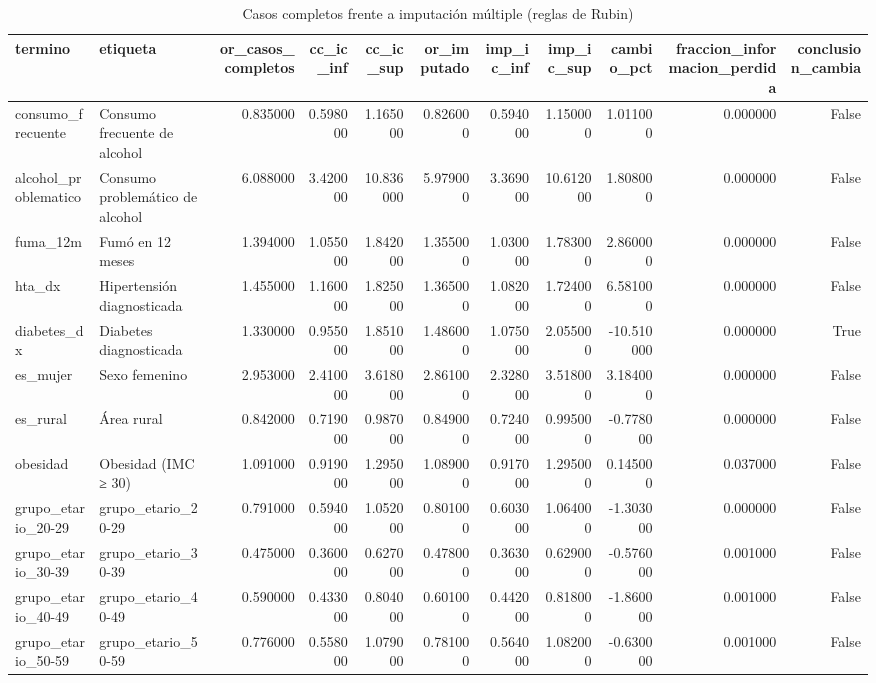\begin{table}[htbp]
\caption{Casos completos frente a imputación múltiple (reglas de Rubin)}
\label{tab:tabla_47_imputacion_multiple}
\begin{tabular}{llrrrrrrrrr}
\toprule
termino & etiqueta & or\_casos\_completos & cc\_ic\_inf & cc\_ic\_sup & or\_imputado & imp\_ic\_inf & imp\_ic\_sup & cambio\_pct & fraccion\_informacion\_perdida & conclusion\_cambia \\
\midrule
consumo\_frecuente & Consumo frecuente de alcohol & 0.835000 & 0.598000 & 1.165000 & 0.826000 & 0.594000 & 1.150000 & 1.011000 & 0.000000 & False \\
alcohol\_problematico & Consumo problemático de alcohol & 6.088000 & 3.420000 & 10.836000 & 5.979000 & 3.369000 & 10.612000 & 1.808000 & 0.000000 & False \\
fuma\_12m & Fumó en 12 meses & 1.394000 & 1.055000 & 1.842000 & 1.355000 & 1.030000 & 1.783000 & 2.860000 & 0.000000 & False \\
hta\_dx & Hipertensión diagnosticada & 1.455000 & 1.160000 & 1.825000 & 1.365000 & 1.082000 & 1.724000 & 6.581000 & 0.000000 & False \\
diabetes\_dx & Diabetes diagnosticada & 1.330000 & 0.955000 & 1.851000 & 1.486000 & 1.075000 & 2.055000 & -10.510000 & 0.000000 & True \\
es\_mujer & Sexo femenino & 2.953000 & 2.410000 & 3.618000 & 2.861000 & 2.328000 & 3.518000 & 3.184000 & 0.000000 & False \\
es\_rural & Área rural & 0.842000 & 0.719000 & 0.987000 & 0.849000 & 0.724000 & 0.995000 & -0.778000 & 0.000000 & False \\
obesidad & Obesidad (IMC ≥ 30) & 1.091000 & 0.919000 & 1.295000 & 1.089000 & 0.917000 & 1.295000 & 0.145000 & 0.037000 & False \\
grupo\_etario\_20-29 & grupo\_etario\_20-29 & 0.791000 & 0.594000 & 1.052000 & 0.801000 & 0.603000 & 1.064000 & -1.303000 & 0.000000 & False \\
grupo\_etario\_30-39 & grupo\_etario\_30-39 & 0.475000 & 0.360000 & 0.627000 & 0.478000 & 0.363000 & 0.629000 & -0.576000 & 0.001000 & False \\
grupo\_etario\_40-49 & grupo\_etario\_40-49 & 0.590000 & 0.433000 & 0.804000 & 0.601000 & 0.442000 & 0.818000 & -1.860000 & 0.001000 & False \\
grupo\_etario\_50-59 & grupo\_etario\_50-59 & 0.776000 & 0.558000 & 1.079000 & 0.781000 & 0.564000 & 1.082000 & -0.630000 & 0.001000 & False \\

\end{tabular}
\end{table}
